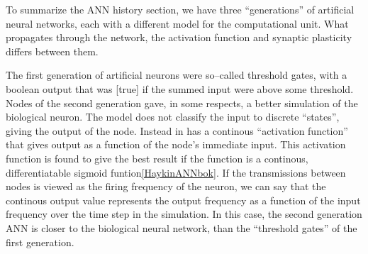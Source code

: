 
To summarize the ANN history section,  we have three ``generations'' of artificial neural networks, each with a different model for the computational unit. %
What propagates through the network, the activation function and synaptic plasticity differs between them. 


The first generation of artificial neurons were so--called threshold gates, with a boolean output that was [true] if the summed input were above some threshold.
Nodes of the second generation gave, in some respects, a better simulation of the biological neuron. %
The model does not classify the input to discrete ``states'', giving the output of the node. 
Instead in has a continous ``activation function'' that gives output as a function of the node's immediate input.
%
This activation function is found to give the best result if the function is a continous, differentiatable sigmoid funtion\ref{HaykinANNbok}.
If the transmissions between nodes is viewed as the firing frequency of the neuron, we can say that the continous output value represents the output frequency as a function of the input frequency over the time step in the simulation.
In this case, the second generation ANN is closer to the biological neural network, than the ``threshold gates'' of the first generation. %


